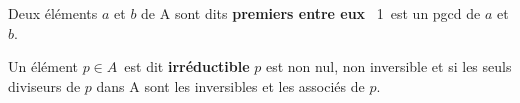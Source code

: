 \vspace{1.2cm}

\noindent Deux éléments $a$ et $b$ de A sont dits \textbf{premiers entre eux} \ssi\, 1\, est un pgcd de $a$ et $b$.

\vspace{1cm}

Un élément $p\in\! A\,$ est dit \textbf{irréductible} \ssi $p$ est non nul, non inversible et si les seuls diviseurs de $p$ dans A sont les inversibles et les associés de $p$.

\newpage
